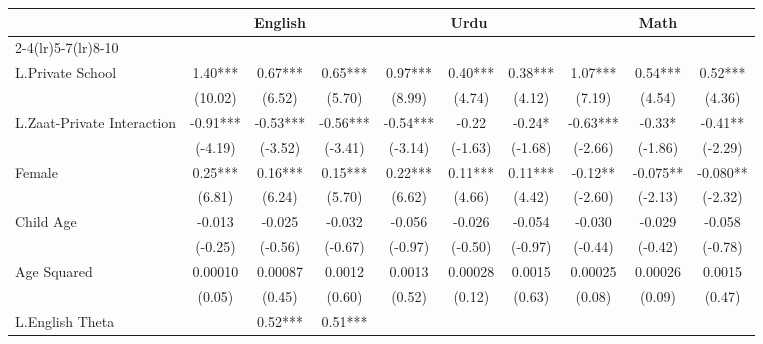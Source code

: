 \begin{sidewaystable}[htbp]\centering
\def\sym#1{\ifmmode^{#1}\else\(^{#1}\)\fi}
\caption{Scores at Class 4\label{wlags}}
\begin{tabular}{l*{9}{c}}
\toprule
                &\multicolumn{3}{c}{English}           &\multicolumn{3}{c}{Urdu}              &\multicolumn{3}{c}{Math}              \\\cmidrule(lr){2-4}\cmidrule(lr){5-7}\cmidrule(lr){8-10}
                &\multicolumn{1}{c}{}&\multicolumn{1}{c}{}&\multicolumn{1}{c}{}&\multicolumn{1}{c}{}&\multicolumn{1}{c}{}&\multicolumn{1}{c}{}&\multicolumn{1}{c}{}&\multicolumn{1}{c}{}&\multicolumn{1}{c}{}\\
\midrule
L.Private School&     1.40***&     0.67***&     0.65***&     0.97***&     0.40***&     0.38***&     1.07***&     0.54***&     0.52***\\
                &  (10.02)   &   (6.52)   &   (5.70)   &   (8.99)   &   (4.74)   &   (4.12)   &   (7.19)   &   (4.54)   &   (4.36)   \\
L.Zaat-Private Interaction&    -0.91***&    -0.53***&    -0.56***&    -0.54***&    -0.22   &    -0.24*  &    -0.63***&    -0.33*  &    -0.41** \\
                &  (-4.19)   &  (-3.52)   &  (-3.41)   &  (-3.14)   &  (-1.63)   &  (-1.68)   &  (-2.66)   &  (-1.86)   &  (-2.29)   \\
Female          &     0.25***&     0.16***&     0.15***&     0.22***&     0.11***&     0.11***&    -0.12** &   -0.075** &   -0.080** \\
                &   (6.81)   &   (6.24)   &   (5.70)   &   (6.62)   &   (4.66)   &   (4.42)   &  (-2.60)   &  (-2.13)   &  (-2.32)   \\
Child Age       &   -0.013   &   -0.025   &   -0.032   &   -0.056   &   -0.026   &   -0.054   &   -0.030   &   -0.029   &   -0.058   \\
                &  (-0.25)   &  (-0.56)   &  (-0.67)   &  (-0.97)   &  (-0.50)   &  (-0.97)   &  (-0.44)   &  (-0.42)   &  (-0.78)   \\
Age Squared     &  0.00010   &  0.00087   &   0.0012   &   0.0013   &  0.00028   &   0.0015   &  0.00025   &  0.00026   &   0.0015   \\
                &   (0.05)   &   (0.45)   &   (0.60)   &   (0.52)   &   (0.12)   &   (0.63)   &   (0.08)   &   (0.09)   &   (0.47)   \\
L.English Theta &            &     0.52***&     0.51***&            &            &            &            &            &            \\

\end{tabular}
\end{sidewaystable}
